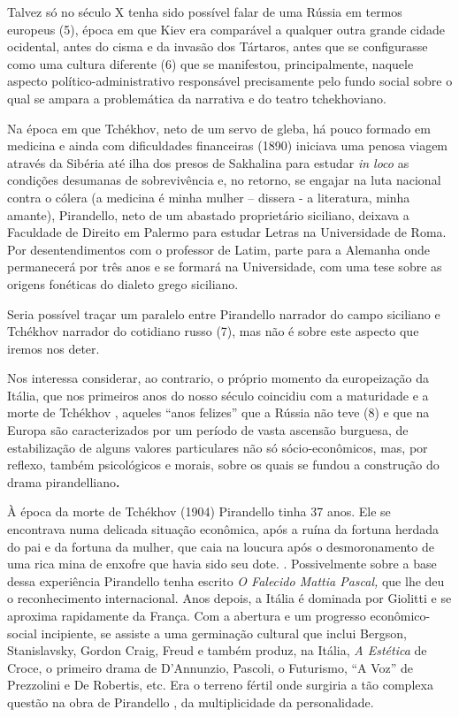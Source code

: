 Talvez só no século X tenha sido possível falar de uma Rússia em termos
europeus (5), época em que Kiev era comparável a qualquer outra grande
cidade ocidental, antes do cisma e da invasão dos Tártaros, antes que se
configurasse como uma cultura diferente (6) que se manifestou,
principalmente, naquele aspecto político-administrativo responsável
precisamente pelo fundo social sobre o qual se ampara a problemática da
narrativa e do teatro tchekhoviano.

Na época em que Tchékhov, neto de um servo de gleba, há pouco formado em
medicina e ainda com dificuldades financeiras (1890) iniciava uma penosa
viagem através da Sibéria até ilha dos presos de Sakhalina para estudar
\emph{in loco} as condições desumanas de sobrevivência e, no retorno, se
engajar na luta nacional contra o cólera (a medicina é minha mulher --
dissera - a literatura, minha amante), Pirandello, neto de um abastado
proprietário siciliano, deixava a Faculdade de Direito em Palermo para
estudar Letras na Universidade de Roma. Por desentendimentos com o
professor de Latim, parte para a Alemanha onde permanecerá por três anos
e se formará na Universidade, com uma tese sobre as origens fonéticas do
dialeto grego siciliano.

Seria possível traçar um paralelo entre Pirandello narrador do campo
siciliano e Tchékhov narrador do cotidiano russo (7), mas não é sobre
este aspecto que iremos nos deter.

Nos interessa considerar, ao contrario, o próprio momento da
europeização da Itália, que nos primeiros anos do nosso século coincidiu
com a maturidade e a morte de Tchékhov , aqueles ``anos felizes'' que a
Rússia não teve (8) e que na Europa são caracterizados por um período de
vasta ascensão burguesa, de estabilização de alguns valores particulares
não só sócio-econômicos, mas, por reflexo, também psicológicos e morais,
sobre os quais se fundou a construção do drama pirandelliano\textbf{. }

À época da morte de Tchékhov (1904) Pirandello tinha 37 anos. Ele se
encontrava numa delicada situação econômica, após a ruína da fortuna
herdada do pai e da fortuna da mulher, que caia na loucura após o
desmoronamento de uma rica mina de enxofre que havia sido seu dote. .
Possivelmente sobre a base dessa experiência Pirandello tenha escrito
\emph{O Falecido Mattia Pascal,} que lhe deu o reconhecimento
internacional. Anos depois, a Itália é dominada por Giolitti e se
aproxima rapidamente da França. Com a abertura e um progresso
econômico-social incipiente, se assiste a uma germinação cultural que
inclui Bergson, Stanislavsky, Gordon Craig, Freud e também produz, na
Itália, \emph{A Estética} de Croce, o primeiro drama de D'Annunzio,
Pascoli, o Futurismo, ``A Voz'' de Prezzolini e De Robertis, etc. Era o
terreno fértil onde surgiria a tão complexa questão na obra de
Pirandello , da multiplicidade da personalidade.

